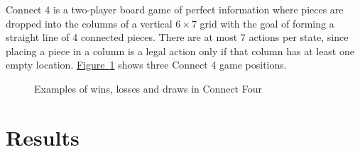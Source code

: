 \documentclass{article}
\begin{document}
Connect 4 is a two-player board game of perfect information where pieces are dropped into the
columns of a vertical $6 \times 7$ grid with the goal of forming a straight line of 4 connected
pieces. There are at most 7 actions per state, since placing a piece in a column is a legal action
only if that column has at least one empty location. \hyperref[fig:c4-game]{Figure~\ref*{fig:c4-game}}
shows three Connect 4 game positions. 


\begin{figure}[!h]
    \centering
     \hspace{0.2in}
     \hspace{0.2in}
    \caption{Examples of wins, losses and draws in Connect Four}
    \label{fig:c4-game}
\end{figure}

\section{Results}
\end{document}
